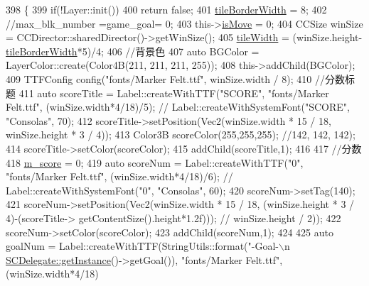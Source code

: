 \begin{DoxyCode}
398                    \{
399     \textcolor{keywordflow}{if}(!Layer::init())
400         \textcolor{keywordflow}{return} \textcolor{keyword}{false};
401     \hyperlink{class_code_lady_j_j_y_1_1game2048_1_1_game_scene_a6f0cd9c0147ba3acc5290d443db8d7d8}{tileBorderWidth} = 8;
402     \textcolor{comment}{//max\_blk\_number =game\_goal= 0;}
403     this->\hyperlink{class_code_lady_j_j_y_1_1game2048_1_1_game_scene_a72716d8ae260804ce013766cf4ad1505}{isMove} = 0;
404     CCSize winSize = CCDirector::sharedDirector()->getWinSize();
405     \hyperlink{class_code_lady_j_j_y_1_1game2048_1_1_game_scene_ab307f78ad0015cd32b2c71483fcb3cc5}{tileWidth} = (winSize.height-\hyperlink{class_code_lady_j_j_y_1_1game2048_1_1_game_scene_a6f0cd9c0147ba3acc5290d443db8d7d8}{tileBorderWidth}*5)/4;
406     \textcolor{comment}{//背景色}
407     \textcolor{keyword}{auto} BGColor = LayerColor::create(Color4B(211, 211, 211, 255));
408     this->addChild(BGColor);
409     TTFConfig config(\textcolor{stringliteral}{"fonts/Marker Felt.ttf"}, winSize.width / 8);
410     \textcolor{comment}{//分数标题}
411     \textcolor{keyword}{auto} scoreTitle = Label::createWithTTF(\textcolor{stringliteral}{"SCORE"}, \textcolor{stringliteral}{"fonts/Marker Felt.ttf"}, (winSize.width*4/18)/5); \textcolor{comment}{//
      Label::createWithSystemFont("SCORE", "Consolas", 70);}
412     scoreTitle->setPosition(Vec2(winSize.width * 15 / 18, winSize.height * 3 / 4));
413     Color3B scoreColor(255,255,255); \textcolor{comment}{//142, 142, 142);}
414     scoreTitle->setColor(scoreColor);
415     addChild(scoreTitle,1);
416     
417     \textcolor{comment}{//分数}
418     \hyperlink{class_code_lady_j_j_y_1_1game2048_1_1_game_scene_abaa6efe9f6fe529d3ed404bc95ba14c4}{m\_score} = 0;
419     \textcolor{keyword}{auto} scoreNum = Label::createWithTTF(\textcolor{stringliteral}{"0"}, \textcolor{stringliteral}{"fonts/Marker Felt.ttf"}, (winSize.width*4/18)/6); \textcolor{comment}{//
      Label::createWithSystemFont("0", "Consolas", 60);}
420     scoreNum->setTag(140);
421     scoreNum->setPosition(Vec2(winSize.width * 15 / 18, (winSize.height * 3 / 4)-(scoreTitle->
      getContentSize().height*1.2f))); \textcolor{comment}{// winSize.height / 2));}
422     scoreNum->setColor(scoreColor);
423     addChild(scoreNum,1);
424     
425     \textcolor{keyword}{auto} goalNum = Label::createWithTTF(StringUtils::format(\textcolor{stringliteral}{"-Goal-\(\backslash\)n%
      \hyperlink{classhsh_1_1_code_lady_j_j_y_1_1game2048_1_1_scene_delegate_a332a574da455fb687b5d283399a6976c}{SCDelegate::getInstance}()->getGoal()), \textcolor{stringliteral}{"fonts/Marker Felt.ttf"}, (winSize.width*4/18)
}
\end{DoxyCode}
